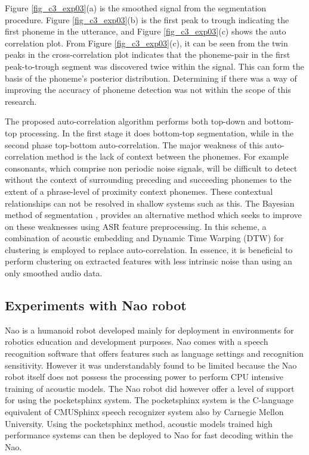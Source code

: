 Figure \ref{fig_c3_exp03}(a) is the smoothed signal from the segmentation procedure.  Figure \ref{fig_c3_exp03}(b) is the first peak to trough indicating the first phoneme in the utterance, and Figure \ref{fig_c3_exp03}(c) shows the auto correlation plot.  From Figure \ref{fig_c3_exp03}(c), it can be seen from the twin peaks in the cross-correlation plot indicates that the phoneme-pair in the first peak-to-trough segment was discovered twice within the signal.  This can form the basis of the phoneme's posterior distribution. Determining if there was a way of improving the accuracy of phoneme detection was not within the scope of this research.

The proposed auto-correlation algorithm performs both top-down and bottom-top processing.  In the first stage it does bottom-top segmentation, while in the second phase top-bottom auto-correlation.   The major weakness of this auto-correlation method is the lack of context between the phonemes.  For example consonants, which comprise non periodic noise signals, will be difficult to detect without the context of surrounding preceding and succeeding phonemes to the extent of a phrase-level of proximity context phonemes.  These contextual relationships can not be resolved in shallow systems such as this.  The Bayesian method of segmentation \citep{kamper2016unsupervised}, provides an alternative method which seeks to improve on these weaknesses using ASR feature preprocessing.  In this scheme, a combination of acoustic embedding and Dynamic Time Warping (DTW) for clustering is employed to replace auto-correlation.  In essence, it is beneficial to perform clustering on extracted features with less intrinsic noise than using an only smoothed audio data.

\subsection{Experiments with Nao robot}
Nao is a humanoid robot developed mainly for deployment in environments for robotics education and development purposes.  Nao comes with a speech recognition software that offers features such as language settings and recognition sensitivity.  However it was understandably found to be limited because the Nao robot itself does not possess the processing power to perform CPU intensive training of acoustic models.  The Nao robot did however offer a level of support for using the pocketsphinx system. The pocketsphinx system is the C-language equivalent of CMUSphinx speech recognizer system also by Carnegie Mellon University.  Using the pocketsphinx method, acoustic models trained high performance systems can then be deployed to Nao for fast decoding within the Nao.  

